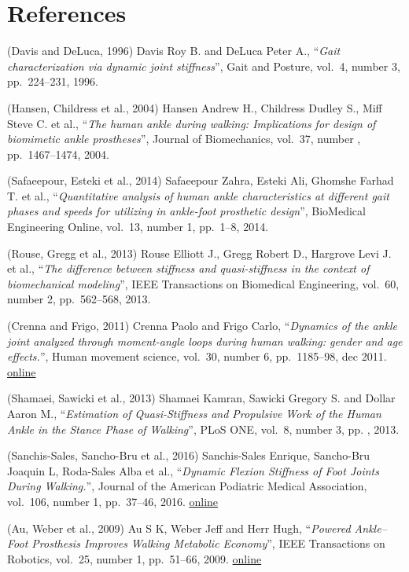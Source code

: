 \documentclass[11pt]{article}
\begin{document}
    \hypertarget{references}{%
\section{References}\label{references}}

(Davis and DeLuca, 1996) Davis Roy B. and DeLuca Peter A., ``\emph{Gait
characterization via dynamic joint stiffness}'', Gait and Posture,
vol.~4, number 3, pp.~224--231, 1996.

(Hansen, Childress et al., 2004) Hansen Andrew H., Childress Dudley S.,
Miff Steve C. et al., ``\emph{The human ankle during walking:
Implications for design of biomimetic ankle prostheses}'', Journal of
Biomechanics, vol.~37, number , pp.~1467--1474, 2004.

(Safaeepour, Esteki et al., 2014) Safaeepour Zahra, Esteki Ali, Ghomshe
Farhad T. et al., ``\emph{Quantitative analysis of human ankle
characteristics at different gait phases and speeds for utilizing in
ankle-foot prosthetic design}'', BioMedical Engineering Online, vol.~13,
number 1, pp.~1--8, 2014.

(Rouse, Gregg et al., 2013) Rouse Elliott J., Gregg Robert D., Hargrove
Levi J. et al., ``\emph{The difference between stiffness and
quasi-stiffness in the context of biomechanical modeling}'', IEEE
Transactions on Biomedical Engineering, vol.~60, number 2, pp.~562--568,
2013.

(Crenna and Frigo, 2011) Crenna Paolo and Frigo Carlo, ``\emph{Dynamics
of the ankle joint analyzed through moment-angle loops during human
walking: gender and age effects.}'', Human movement science, vol.~30,
number 6, pp.~1185--98, dec 2011.
\href{http://www.sciencedirect.com/science/article/pii/S016794571100073X}{online}

(Shamaei, Sawicki et al., 2013) Shamaei Kamran, Sawicki Gregory S. and
Dollar Aaron M., ``\emph{Estimation of Quasi-Stiffness and Propulsive
Work of the Human Ankle in the Stance Phase of Walking}'', PLoS ONE,
vol.~8, number 3, pp. , 2013.

(Sanchis-Sales, Sancho-Bru et al., 2016) Sanchis-Sales Enrique,
Sancho-Bru Joaquin L, Roda-Sales Alba et al., ``\emph{Dynamic Flexion
Stiffness of Foot Joints During Walking.}'', Journal of the American
Podiatric Medical Association, vol.~106, number 1, pp.~37--46, 2016.
\href{http://www.ncbi.nlm.nih.gov/pubmed/26895359}{online}

(Au, Weber et al., 2009) Au S K, Weber Jeff and Herr Hugh,
``\emph{Powered Ankle--Foot Prosthesis Improves Walking Metabolic
Economy}'', IEEE Transactions on Robotics, vol.~25, number 1,
pp.~51--66, 2009.
\href{http://ieeexplore.ieee.org/document/4738392/}{online}
\end{document}
